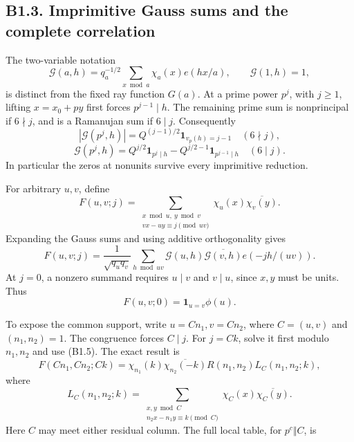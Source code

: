 \documentclass[11pt,a4paper]{article}
\begin{document}
\hypertarget{b1.3.-imprimitive-gauss-sums-and-the-complete-correlation}{%
\subsection{B1.3. Imprimitive Gauss sums and the complete
correlation}\label{b1.3.-imprimitive-gauss-sums-and-the-complete-correlation}}

The two-variable notation \[
\mathcal G(a,h)=q_a^{-1/2}\sum_{x\bmod a}\chi_a(x)e(hx/a),\qquad \mathcal G(1,h)=1,
\tag{B1.12}
\] is distinct from the fixed ray function \(G(a)\). At a prime power
\(p^j\), with \(j\ge1\), lifting \(x=x_0+py\) first forces
\(p^{j-1}\mid h\). The remaining prime sum is nonprincipal if
\(6\nmid j\), and is a Ramanujan sum if \(6\mid j\). Consequently \[
|\mathcal G(p^j,h)|=Q^{(j-1)/2}\mathbf1_{v_p(h)=j-1}\quad(6\nmid j),
\] \[
\mathcal G(p^j,h)=Q^{j/2}\mathbf1_{p^j\mid h}-Q^{j/2-1}\mathbf1_{p^{j-1}\mid h}\quad(6\mid j).
\tag{B1.13}
\] In particular the zeros at nonunits survive every imprimitive
reduction.

For arbitrary \(u,\allowbreak{}v\), define \[
F(u,v;j)=\sum_{\substack{x\bmod u,\ y\bmod v\\vx-uy\equiv j\pmod{uv}}}\chi_u(x)\overline{\chi_v(y)}.
\tag{B1.14}
\] Expanding the Gauss sums and using additive orthogonality gives \[
F(u,v;j)=\frac1{\sqrt{q_uq_v}}\sum_{h\bmod uv}\mathcal G(u,h)\overline{\mathcal G(v,h)}e(-jh/(uv)).
\tag{B1.15}
\] At \(j=0\), a nonzero summand requires \(u\mid v\) and \(v\mid u\),
since \(x,\allowbreak{}y\) must be units. Thus \[
F(u,v;0)=\mathbf1_{u=v}\phi(u).
\tag{B1.16}
\]

To expose the common support, write \(u=Cn_1,\allowbreak{}v=Cn_2\), where \(C=(u,\allowbreak{}v)\)
and \((n_1,\allowbreak{}n_2)=1\). The congruence forces \(C\mid j\). For \(j=Ck\),
solve it first modulo \(n_1,\allowbreak{}n_2\) and use (B1.5). The exact result is \[
F(Cn_1,Cn_2;Ck)=\chi_{n_1}(k)\overline{\chi_{n_2}(-k)}R(n_1,n_2)L_C(n_1,n_2;k),
\tag{B1.17}
\] where \[
L_C(n_1,n_2;k)=\sum_{\substack{x,y\bmod C\\n_2x-n_1y\equiv k\pmod C}}\chi_C(x)\overline{\chi_C(y)}.
\] Here \(C\) may meet either residual column. The full local table, for
\(p^c\Vert C\), is
\end{document}
